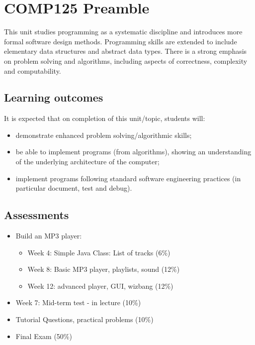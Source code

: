 %
\maketitle
\tableofcontents
%
\newpage
%
\chapter{COMP125 Preamble}
\label{sec:COMP125Preamble}
This unit studies programming as a systematic discipline and introduces more
formal software design methods. Programming skills are extended to include
elementary data structures and abstract data types. There is a strong emphasis
on problem solving and algorithms, including aspects of correctness, complexity
and computability.

\section{Learning outcomes}
It is expected that on completion of this unit/topic, students will:
\begin{itemize}
  \item demonstrate enhanced problem solving/algorithmic skills;
  \item be able to implement programs (from algorithms), showing an
        understanding of the underlying architecture of the computer;
  \item implement programs following standard software engineering practices (in
        particular document, test and debug).
\end{itemize}

\section{Assessments}
\begin{itemize}
  \item Build an MP3 player:
  \begin{itemize}
    \item Week 4: Simple Java Class: List of tracks (6\%)
    \item Week 8: Basic MP3 player, playlists, sound (12\%)
    \item Week 12: advanced player, GUI, wizbang (12\%)
  \end{itemize}
  \item Week 7: Mid-term test - in lecture (10\%)
  \item Tutorial Questions, practical problems (10\%)
  \item Final Exam (50\%)
\end{itemize}

